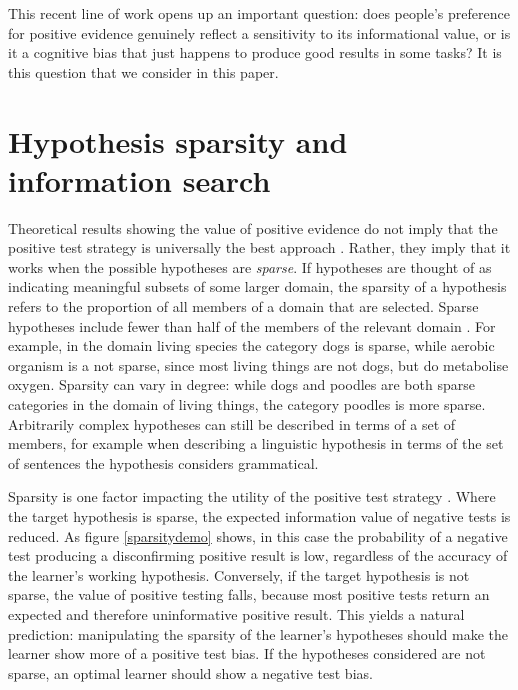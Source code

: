 \documentclass[10pt,letterpaper]{article}
\begin{document}
This recent line of work opens up an important question: does people's preference for positive evidence genuinely reflect a sensitivity to its informational value, or is it a cognitive bias that just happens to produce good results in some tasks? It is this question that we consider in this paper.


\section{Hypothesis sparsity and information search}

Theoretical results showing the value of positive evidence do not imply that the positive test strategy is universally the best approach \cite{klayman1987confirmation,austerweil2011deterministic,navarro2011sparsecat}. Rather, they imply that it works when the possible hypotheses are {\it sparse}. If hypotheses are thought of as indicating meaningful subsets of some larger domain, the sparsity of a hypothesis refers to the proportion of all members of a domain that are selected. Sparse hypotheses include fewer than half of the members of the relevant domain \cite{navarro2011sparsecat}. For example, in the domain {\sc living species} the category {\sc dogs} is sparse, while {\sc aerobic organism} is a not sparse, since most living things are not dogs, but do metabolise oxygen. Sparsity can vary in degree: while {\sc dogs} and {\sc poodles} are both sparse categories in the domain of living things, the category {\sc poodles} is more sparse. Arbitrarily complex hypotheses can still be described in terms of a set of members, for example when describing a linguistic hypothesis in terms of the set of sentences the hypothesis considers grammatical.


Sparsity is one factor impacting the utility of the positive test strategy \cite{klayman1987confirmation, navarro2011sparsecat}. Where the target hypothesis is sparse, the expected information value of negative tests is reduced. As figure \ref{sparsitydemo} shows, in this case the probability of a negative test producing a disconfirming positive result is low, regardless of the accuracy of the learner's working hypothesis.
 Conversely, if the target hypothesis is not sparse, the value of positive testing falls, because most positive tests return an expected and therefore uninformative positive result. This yields a natural prediction: manipulating the sparsity of the learner's hypotheses should make the learner show more of a positive test bias. If the hypotheses considered are not sparse, an optimal learner should show a negative test bias.
\end{document}
